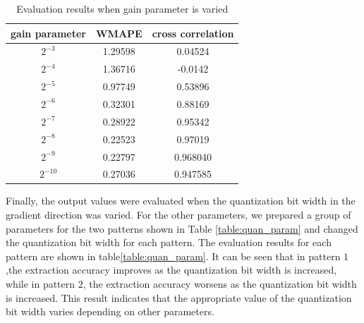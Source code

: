 \begin{table}[tb]
  \centering
  \caption{Evaluation results when gain parameter is varied}
  \label{table:gain}
  \begin{tabular}{|c|c|c|}
    \hline
    gain parameter   & WMAPE & cross correlation     \\ \hline \hline
    $2^{-3}$        &1.29598 &0.04524       \\ \hline
    $2^{-4}$        &1.36716  & -0.0142 \\ \hline
    $2^{-5}$        &0.97749  &0.53896 \\ \hline
    $2^{-6}$       &0.32301  &0.88169  \\ \hline
    $2^{-7}$        &0.28922  &0.95342  \\ \hline
    $2^{-8}$        &0.22523  &0.97019   \\ \hline
    $2^{-9}$        &0.22797  &0.968040  \\ \hline
    $2^{-10}$       &0.27036  &0.947585  \\ \hline
  \end{tabular}
\end{table}




Finally, the output values were evaluated when the quantization bit width in the gradient direction was varied.
For the other parameters, we prepared a group of parameters for the two patterns shown in Table \ref{table:quan_param}
and changed the quantization bit width for each pattern.
The evaluation results for each pattern are shown in table\ref{table:quan_param}.
It can be seen that in pattern $1$,the extraction accuracy improves as the quantization bit width is increased,
while in pattern $2$, the extraction accuracy worsens as the quantization bit width is increased.
This result indicates that the appropriate value of the quantization bit width varies depending on other parameters.



